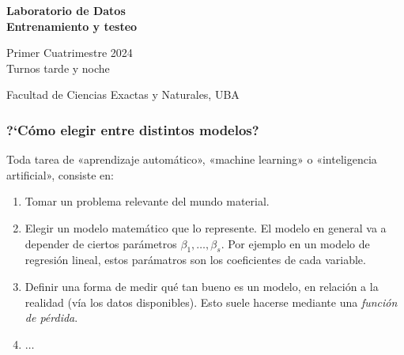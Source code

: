 \documentclass[aspectratio=169,12pt]{beamer}
\begin{document}

\begin{frame}

 \begin{center}

\Large\textbf{Laboratorio de Datos} \\
\large\textbf{Entrenamiento y testeo}




\vspace{1cm}
Primer Cuatrimestre 2024 \\ Turnos tarde y noche

\vspace{1cm}


 {\small Facultad de Ciencias Exactas y Naturales, UBA}
 \end{center}


\end{frame}


\begin{frame}
\frametitle{?`C\'omo elegir entre distintos modelos?}

Toda tarea de «aprendizaje automático», «machine learning» o «inteligencia artificial»,
consiste en:
\begin{enumerate}
\item Tomar un problema relevante del mundo material.
\item Elegir un modelo matemático que lo represente. El modelo en general va a depender de ciertos parámetros $\beta_1, \dots, \beta_s$.
Por ejemplo en un modelo de regresión lineal, estos parámatros son los coeficientes de cada variable.
\item Definir una forma de medir qu\'e tan bueno es un modelo, en relación a la realidad (vía los datos disponibles).
Esto suele hacerse mediante una \emph{función de pérdida}.
\item $\dots$
\end{enumerate}
\end{frame}
\end{document}

